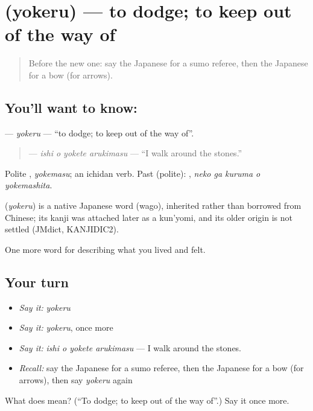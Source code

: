 \section[\texorpdfstring{\ja{よける} (yokeru)}{よける (yokeru)}]{ (yokeru) — to dodge; to keep out of the way of}

\label{lesson:JA-C505-yokeru}



\begin{quote}
Before the new one: say the Japanese for a sumo referee, then the Japanese for a bow (for arrows).
\end{quote}

\subsection*{You'll want to know: }
\textbf{} — \emph{yokeru} — \textquotedblleft{}to dodge; to keep out of the way of\textquotedblright{}.

\begin{quote}
\textbf{  } — \emph{ishi o yokete arukimasu} — \textquotedblleft{}I walk around the stones.\textquotedblright{}
\end{quote}

Polite \textbf{}, \emph{yokemasu}; an ichidan verb. Past (polite): \textbf{  }, \emph{neko ga kuruma o yokemashita}.

\begin{cousinweb}
\textbf{} (\emph{yokeru}) is a native Japanese word (wago), inherited rather than borrowed from Chinese; its kanji was attached later as a kun'yomi, and its older origin is not settled (JMdict, KANJIDIC2).
\end{cousinweb}

\begin{grammarlens}[title={What you've built}]
One more word for describing what you lived and felt.
\end{grammarlens}

\subsection*{Your turn}
\begin{itemize}
\raggedright
  \item \emph{Say it:} \emph{yokeru}
  \item \emph{Say it:} \emph{yokeru}, once more
  \item \emph{Say it:} \emph{ishi o yokete arukimasu} — I walk around the stones.
  \item \emph{Recall:} say the Japanese for a sumo referee, then the Japanese for a bow (for arrows), then say \emph{yokeru} again
\end{itemize}

\begin{tcolorbox}[breakable,colback=teal!4,colframe=teal!35!black,title={Before you move on}]
What does  mean? (\textquotedblleft{}To dodge; to keep out of the way of\textquotedblright{}.) Say it once more.
\end{tcolorbox}

